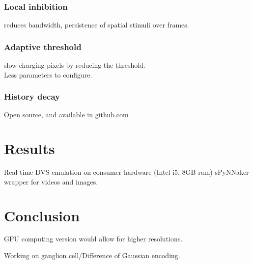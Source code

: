 \documentclass[twocolumn]{article}
\begin{document}
\subsubsection{Local inhibition} reduces bandwidth, persistence of spatial stimuli over frames. 
\subsubsection{Adaptive threshold} slow-charging pixels by reducing the threshold.\\
Less parameters to configure.
\subsubsection{History decay}
Open source, and available in github.com\\

\section{Results}

Real-time DVS emulation on consumer hardware (Intel i5, 8GB ram)
sPyNNaker wrapper for videos and images.

\section{Conclusion}

GPU computing version would allow for higher resolutions.

Working on ganglion cell/Difference of Gaussian encoding.

\printbibliography
\end{document}

